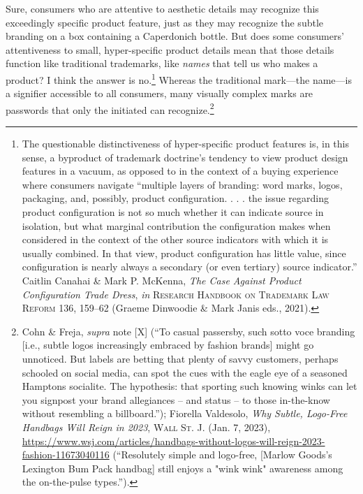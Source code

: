 \documentclass[letterpaper, 11pt, oneside]{article}
\begin{document}
\noindent Sure, consumers who are attentive to aesthetic details may recognize this exceedingly specific product feature, just as they may recognize the subtle branding on a box containing a Caperdonich bottle. But does some consumers' attentiveness to small, hyper-specific product details mean that those details function like traditional trademarks, like \textit{names} that tell us who makes a product? I think the answer is no.\footnote{The questionable distinctiveness of hyper-specific product features is, in this sense, a byproduct of trademark doctrine's tendency to view product design features in a vacuum, as opposed to in the context of a buying experience where consumers navigate ``multiple layers of branding: word marks, logos, packaging, and, possibly, product configuration. . . . the issue regarding product configuration is not so much whether it can indicate source in isolation, but what marginal contribution the configuration makes when considered in the context of the other source indicators with which it is usually combined. In that view, product configuration has little value, since configuration is nearly always a secondary (or even tertiary) source indicator.'' Caitlin Canahai \& Mark P. McKenna, \textit{The Case Against Product Configuration Trade Dress}, \textit{in} \textsc{Research Handbook on Trademark Law Reform} 136, 159–62 (Graeme Dinwoodie \& Mark Janis eds., 2021).} Whereas the traditional mark—the name—is a signifier accessible to all consumers, many visually complex marks are passwords that only the initiated can recognize.\footnote{Cohn \& Freja, \textit{supra} note [X] (``To casual passersby, such sotto voce branding [i.e., subtle logos increasingly embraced by fashion brands] might go unnoticed. But labels are betting that plenty of savvy customers, perhaps schooled on social media, can spot the cues with the eagle eye of a seasoned Hamptons socialite. The hypothesis: that sporting such knowing winks can let you signpost your brand allegiances -- and status -- to those in-the-know without resembling a billboard.''); Fiorella Valdesolo, \textit{Why Subtle, Logo-Free Handbags Will Reign in 2023}, \textsc{Wall St. J.} (Jan. 7, 2023), \url{https://www.wsj.com/articles/handbags-without-logos-will-reign-2023-fashion-11673040116} (``Resolutely simple and logo-free, [Marlow Goods's Lexington Bum Pack handbag] still enjoys a "wink wink" awareness among the on-the-pulse types.'').}
\end{document}
